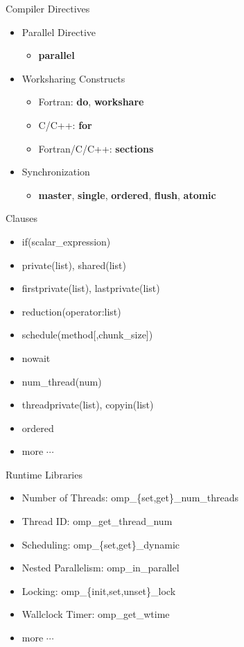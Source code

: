 \documentclass[10pt,t]{beamer}
\begin{document}
\begin{frame}{Compiler Directives}
  \begin{itemize}
    \item Parallel Directive
    \begin{itemize}
      \item {\bf\color{red!90!black}parallel}
    \end{itemize}
    \item Worksharing Constructs
    \begin{itemize}
      \item Fortran: {\bf\color{red!90!black}do}, {\bf\color{red!90!black}workshare}
      \item C/C++: {\bf\color{red!90!black}for}
      \item Fortran/C/C++: {\bf\color{red!90!black}sections}
    \end{itemize}
    \item Synchronization
    \begin{itemize}
      \item {\bf\color{red!90!black}master}, {\bf\color{red!90!black}single}, {\bf\color{red!90!black}ordered}, {\bf\color{red!90!black}flush}, {\bf\color{red!90!black}atomic}
    \end{itemize}
  \end{itemize}
\end{frame}

\begin{frame}{Clauses}
  \begin{itemize}
    \item if(scalar\_expression)
    \item private(list), shared(list)
    \item firstprivate(list), lastprivate(list)
    \item reduction(operator:list)
    \item schedule(method[,chunk\_size])
    \item nowait
    \item num\_thread(num)
    \item threadprivate(list), copyin(list)
    \item ordered
    \item more $\cdots$
  \end{itemize}
\end{frame}

\begin{frame}{Runtime Libraries}
  \begin{itemize}
    \item Number of Threads: omp\_\{set,get\}\_num\_threads
    \item Thread ID: omp\_get\_thread\_num
    \item Scheduling: omp\_\{set,get\}\_dynamic
    \item Nested Parallelism: omp\_in\_parallel
    \item Locking: omp\_\{init,set,unset\}\_lock
    \item Wallclock Timer: omp\_get\_wtime
    \item more $\cdots$
  \end{itemize}
\end{frame}
\end{document}
